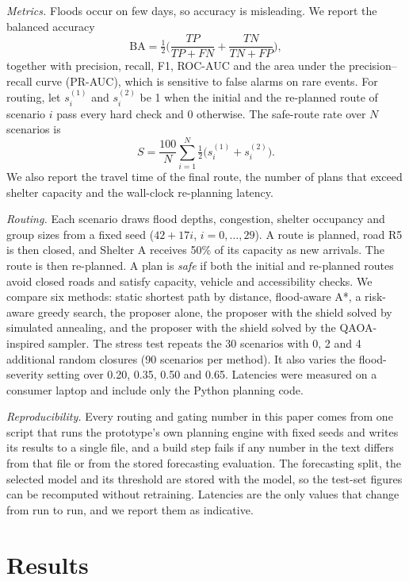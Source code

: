 \documentclass[conference]{IEEEtran}
\begin{document}
\textit{Metrics.} Floods occur on few days, so accuracy is misleading. We report the balanced accuracy
\begin{equation}
\mathrm{BA}=\tfrac12\Big(\frac{TP}{TP+FN}+\frac{TN}{TN+FP}\Big),
\label{eq:ba}
\end{equation}
together with precision, recall, F1, ROC-AUC and the area under the precision--recall curve (PR-AUC), which is sensitive to false alarms on rare events. For routing, let $s^{(1)}_i$ and $s^{(2)}_i$ be 1 when the initial and the re-planned route of scenario $i$ pass every hard check and 0 otherwise. The safe-route rate over $N$ scenarios is
\begin{equation}
S=\frac{100}{N}\sum_{i=1}^{N}\tfrac12\big(s^{(1)}_i+s^{(2)}_i\big).
\label{eq:safe}
\end{equation}
We also report the travel time of the final route, the number of plans that exceed shelter capacity and the wall-clock re-planning latency.

\textit{Routing.} Each scenario draws flood depths, congestion, shelter occupancy and group sizes from a fixed seed ($42+17i$, $i=0,\dots,29$). A route is planned, road R5 is then closed, and Shelter A receives 50\% of its capacity as new arrivals. The route is then re-planned. A plan is \emph{safe} if both the initial and re-planned routes avoid closed roads and satisfy capacity, vehicle and accessibility checks. We compare six methods: static shortest path by distance, flood-aware A*, a risk-aware greedy search, the proposer alone, the proposer with the shield solved by simulated annealing, and the proposer with the shield solved by the QAOA-inspired sampler. The stress test repeats the 30 scenarios with 0, 2 and 4 additional random closures (90 scenarios per method). It also varies the flood-severity setting over 0.20, 0.35, 0.50 and 0.65. Latencies were measured on a consumer laptop and include only the Python planning code.

\textit{Reproducibility.} Every routing and gating number in this paper comes from one script that runs the prototype's own planning engine with fixed seeds and writes its results to a single file, and a build step fails if any number in the text differs from that file or from the stored forecasting evaluation. The forecasting split, the selected model and its threshold are stored with the model, so the test-set figures can be recomputed without retraining. Latencies are the only values that change from run to run, and we report them as indicative.

\section{Results}
\end{document}
